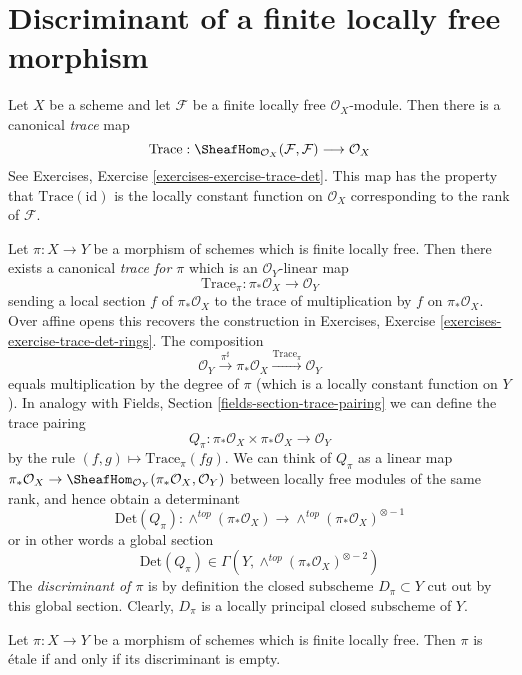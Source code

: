 \section{Discriminant of a finite locally free morphism}
\label{section-discriminant}

\noindent
Let $X$ be a scheme and let $\mathcal{F}$ be a finite locally
free $\mathcal{O}_X$-module. Then there is a canonical {\it trace} map
$$
\text{Trace} :
\SheafHom_{\mathcal{O}_X}(\mathcal{F}, \mathcal{F})
\longrightarrow
\mathcal{O}_X
$$
See Exercises, Exercise \ref{exercises-exercise-trace-det}. This map has
the property that $\text{Trace}(\text{id})$ is the locally constant function
on $\mathcal{O}_X$ corresponding to the rank of $\mathcal{F}$.

\medskip\noindent
Let $\pi : X \to Y$ be a morphism of schemes which is finite locally
free. Then there exists a canonical {\it trace for $\pi$}
which is an $\mathcal{O}_Y$-linear map
$$
\text{Trace}_\pi : \pi_*\mathcal{O}_X \longrightarrow \mathcal{O}_Y
$$
sending a local section $f$ of $\pi_*\mathcal{O}_X$ to the
trace of multiplication by $f$ on $\pi_*\mathcal{O}_X$. Over
affine opens this recovers the construction in
Exercises, Exercise \ref{exercises-exercise-trace-det-rings}.
The composition
$$
\mathcal{O}_Y \xrightarrow{\pi^\sharp} \pi_*\mathcal{O}_X
\xrightarrow{\text{Trace}_\pi} \mathcal{O}_Y
$$
equals multiplication by the degree of $\pi$ (which is a locally constant
function on $Y$). In analogy with
Fields, Section \ref{fields-section-trace-pairing}
we can define the trace pairing
$$
Q_\pi :
\pi_*\mathcal{O}_X \times \pi_*\mathcal{O}_X
\longrightarrow
\mathcal{O}_Y
$$
by the rule $(f, g) \mapsto \text{Trace}_\pi(fg)$. We can think of
$Q_\pi$ as a linear map
$\pi_*\mathcal{O}_X \to
\SheafHom_{\mathcal{O}_Y}(\pi_*\mathcal{O}_X, \mathcal{O}_Y)$
between locally free modules of the same rank, and hence obtain
a determinant
$$
\text{Det}(Q_\pi) :
\wedge^{top}(\pi_*\mathcal{O}_X)
\longrightarrow
\wedge^{top}(\pi_*\mathcal{O}_X)^{\otimes -1}
$$
or in other words a global section
$$
\text{Det}(Q_\pi) \in \Gamma(Y, \wedge^{top}(\pi_*\mathcal{O}_X)^{\otimes -2})
$$
The {\it discriminant of $\pi$} is by definition the closed
subscheme $D_\pi \subset Y$ cut out by this global section.
Clearly, $D_\pi$ is a locally principal closed subscheme of $Y$.

\begin{lemma}
\label{lemma-discriminant}
Let $\pi : X \to Y$ be a morphism of schemes which is finite locally
free. Then $\pi$ is \'etale if and only if its discriminant is empty.
\end{lemma}

